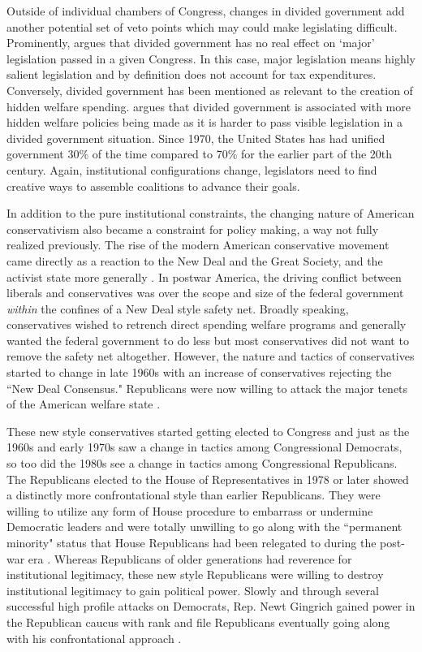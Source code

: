 \documentclass[12pt]{article}
\begin{document}
Outside of individual chambers of Congress, changes in divided government add another potential set of veto points which may could make legislating difficult. Prominently, \cite{mayhew1990} argues that divided government has no real effect on `major' legislation passed in a given Congress. In this case, major legislation means highly salient legislation and by definition does not account for tax expenditures. Conversely, divided government has been mentioned as relevant to the creation of hidden welfare spending. \citet[Ch. 4]{howard2008} argues that divided government is associated with more hidden welfare policies being made as it is harder to pass visible legislation in a divided government situation. Since 1970, the United States has had unified government 30\% of the time compared to 70\% for the earlier part of the 20th century. Again, institutional configurations change, legislators need to find creative ways to assemble coalitions to advance their goals.

In addition to the pure institutional constraints, the changing nature of American conservativism also became a constraint for policy making, a way not fully realized previously. The rise of the modern American conservative movement came directly as a reaction to the New Deal and the Great Society, and the activist state more generally \citep{critchlow2007, zelizer2010}. In postwar America, the driving conflict between liberals and conservatives was over the scope and size of the federal government \emph{within} the confines of a New Deal style safety net. Broadly speaking, conservatives wished to retrench direct spending welfare programs and generally wanted the federal government to do less but most conservatives did not want to remove the safety net altogether. However, the nature and tactics of conservatives started to change in late 1960s with an increase of conservatives rejecting the ``New Deal Consensus." Republicans were now willing to attack the major tenets of the American welfare state \citep{teles2007, skocpol2007}.

These new style conservatives started getting elected to Congress and just as the 1960s and early 1970s saw a change in tactics among Congressional Democrats, so too did the 1980s see a change in tactics among Congressional Republicans. The Republicans elected to the House of Representatives in 1978 or later showed a distinctly more confrontational style than earlier Republicans. They were willing to utilize any form of House procedure to embarrass or undermine Democratic leaders and were totally unwilling to go along with the ``permanent minority" status that House Republicans had been relegated to during the post-war era \citep{theriault2013}. Whereas Republicans of older generations had reverence for institutional legitimacy, these new style Republicans were willing to destroy institutional legitimacy to gain political power. Slowly and through several successful high profile attacks on Democrats, Rep. Newt Gingrich gained power in the Republican caucus with rank and file Republicans eventually going along with his confrontational approach \citep{harris2006}. 
\end{document}
